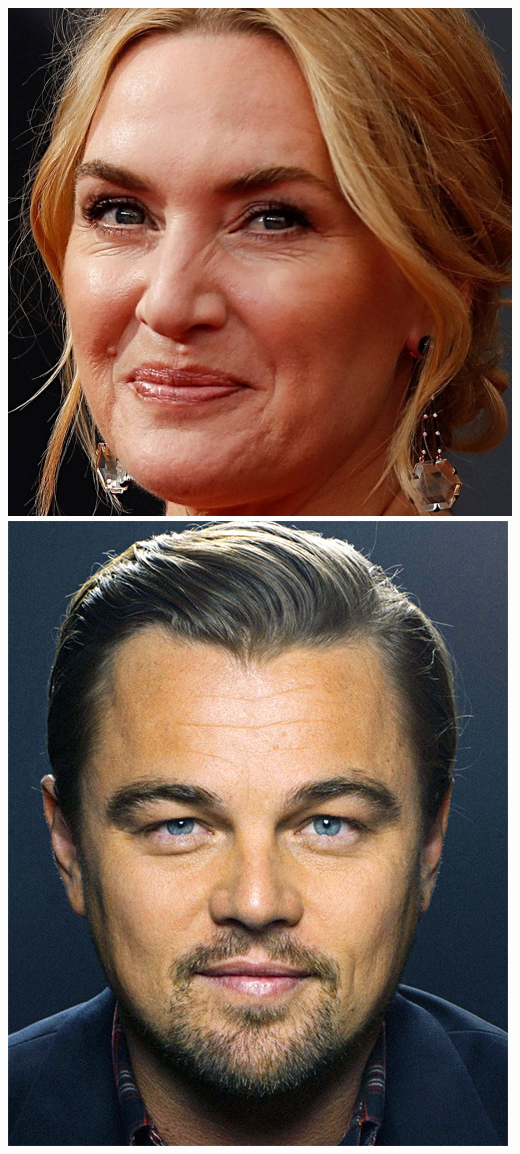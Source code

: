 \documentclass{article}
\begin{document}
\begin{center}
\begin{multicols}{4}
\includegraphics[scale=0.16]{images/Kate_Winslet.jpg}
\includegraphics[scale=0.16]{images/Leonardo Di Caprio.jpg}
\end{multicols}
\end{center}    
\end{document}
